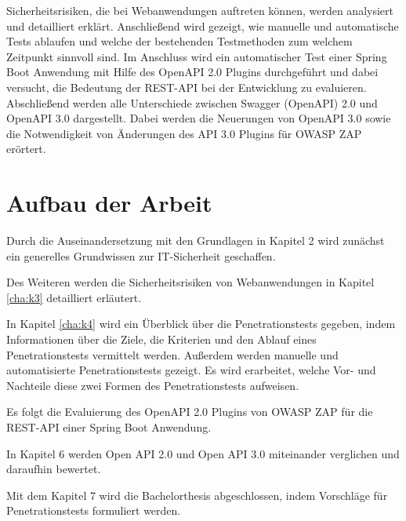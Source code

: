 Sicherheitsrisiken, die bei Webanwendungen auftreten können, werden analysiert und detailliert erklärt. Anschließend wird gezeigt, wie manuelle und automatische Tests ablaufen und welche der bestehenden Testmethoden zum welchem Zeitpunkt sinnvoll sind. Im Anschluss wird ein automatischer Test einer Spring Boot Anwendung mit Hilfe des OpenAPI 2.0 Plugins durchgeführt und dabei versucht, die Bedeutung der REST-API bei der Entwicklung zu evaluieren. Abschließend werden alle Unterschiede zwischen Swagger (OpenAPI) 2.0 und OpenAPI 3.0 dargestellt. Dabei werden die Neuerungen von OpenAPI 3.0 sowie die Notwendigkeit von Änderungen des API 3.0 Plugins für OWASP ZAP erörtert.

\section{Aufbau der Arbeit}

Durch die Auseinandersetzung mit den Grundlagen in Kapitel 2 wird zunächst ein generelles Grundwissen zur IT-Sicherheit geschaffen.

Des Weiteren werden die Sicherheitsrisiken von Webanwendungen in Kapitel \ref{cha:k3} detailliert erläutert. 

In Kapitel \ref{cha:k4} wird ein Überblick über die Penetrationstests gegeben, indem Informationen über die Ziele, die Kriterien und den Ablauf eines Penetrationstests vermittelt werden. Außerdem werden manuelle und automatisierte Penetrationstests gezeigt. Es wird erarbeitet, welche Vor- und Nachteile diese zwei Formen des Penetrationstests aufweisen.

Es folgt die Evaluierung des OpenAPI 2.0 Plugins von OWASP ZAP für die REST-API einer Spring Boot Anwendung.

In Kapitel 6 werden Open API 2.0 und Open API 3.0 miteinander verglichen und daraufhin bewertet.

Mit dem Kapitel 7 wird die Bachelorthesis abgeschlossen, indem Vorschläge für Penetrationstests formuliert werden.


